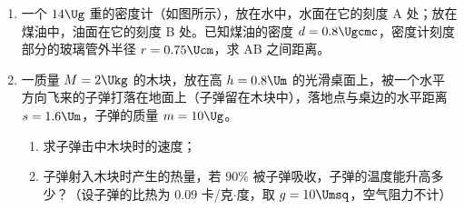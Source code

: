 \documentclass[\gkver]{gaokaozhenti}
\begin{document}
\begin{enumerate}
{$U=I_{g}(r+R_{1})=0.001\times(100+9900)\UV=10\UV$。

评分标准：全题 13 分，（1）5 分；（2）两表的量程各 4 分，共 8 分。
}

\item
一个 $14\Ug$ 重的密度计（如图所示），放在水中，水面在它的刻度 A 处；放在煤油中，油面在它的刻度 B 处。已知煤油的密度 $d=0.8\Ugcmc$，密度计刻度部分的玻璃管外半径 $r=0.75\Ucm$，求 AB 之间距离。

\jdanswer{
$2\Ucm$
}


\item
一质量 $M=2\Ukg$ 的木块，放在高 $h=0.8\Um$ 的光滑桌面上，被一个水平方向飞来的子弹打落在地面上（子弹留在木块中），落地点与桌边的水平距离 $s=1.6\Um$，子弹的质量 $m=10\Ug$。

\begin{enumerate}
	\item
	求子弹击中木块时的速度；
	\item
	子弹射入木块时产生的热量，若 90\% 被子弹吸收，子弹的温度能升高多少？（设子弹的比热为 $0.09$ 卡/克$\cdot$度，取 $g=10\Umsq$，空气阻力不计）
\end{enumerate}

\jdanswer{
\begin{enumerate}
	\item
	$804\Ums$


\end{enumerate}}
\end{enumerate}
\end{document}
